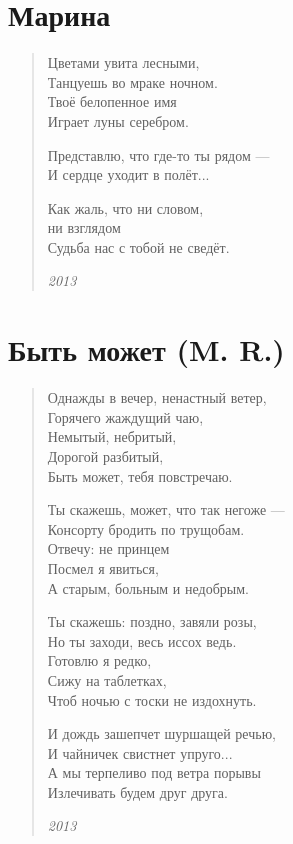 \section{Марина}

\begin{verse}
Цветами увита лесными,\\
Танцуешь во мраке ночном.\\
Твоё белопенное имя\\
Играет луны серебром.

Представлю, что где-то ты рядом ---\\
И сердце уходит в полёт...

Как жаль, что ни словом,\\
ни взглядом\\
Судьба нас с тобой не сведёт.

\emph{2013}
\end{verse}
\newpage

\section{Быть может (M. R.)}

\begin{verse}
Однажды в вечер, ненастный ветер,\\
Горячего жаждущий чаю,\\
Немытый, небритый,\\
Дорогой разбитый,\\
Быть может, тебя повстречаю.

Ты скажешь, может, что так негоже ---\\
Консорту бродить по трущобам.\\
Отвечу: не принцем\\
Посмел я явиться,\\
А старым, больным и недобрым.

Ты скажешь: поздно, завяли розы,\\
Но ты заходи, весь иссох ведь.\\
Готовлю я редко,\\
Сижу на таблетках,\\
Чтоб ночью с тоски не издохнуть.

И дождь зашепчет шуршащей речью,\\
И чайничек свистнет упруго...\\
А мы терпеливо под ветра порывы\\
Излечивать будем друг друга.

\emph{2013}
\end{verse}
\newpage

